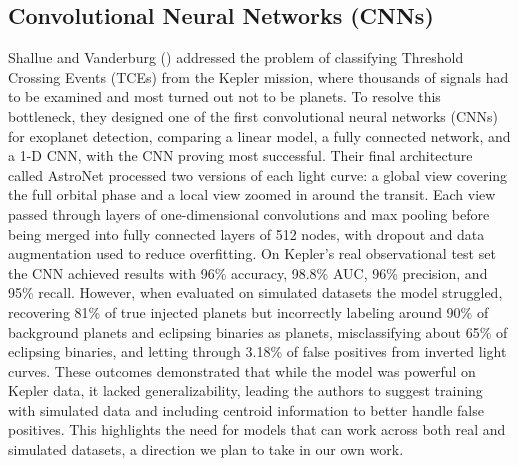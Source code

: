 \documentclass[letterpaper]{article} %
\begin{document}
\subsection{Convolutional Neural Networks (CNNs)}
Shallue and Vanderburg (\citeyear{Shallue2018identifyexoplanetsI}) addressed the problem of classifying Threshold Crossing Events (TCEs) from the Kepler mission, where thousands of signals had to be examined and most turned out not to be planets. To resolve this bottleneck, they designed one of the first convolutional neural networks (CNNs) for exoplanet detection, comparing a linear model, a fully connected network, and a 1-D CNN, with the CNN proving most successful. Their final architecture called AstroNet processed two versions of each light curve: a global view covering the full orbital phase and a local view zoomed in around the transit. Each view passed through layers of one-dimensional convolutions and max pooling before being merged into fully connected layers of 512 nodes, with dropout and data augmentation used to reduce overfitting. On Kepler’s real observational test set the CNN achieved results with 96\% accuracy, 98.8\% AUC, 96\% precision, and 95\% recall. However, when evaluated on simulated datasets the model struggled, recovering 81\% of true injected planets but incorrectly labeling around 90\% of background planets and eclipsing binaries as planets, misclassifying about 65\% of eclipsing binaries, and letting through 3.18\% of false positives from inverted light curves. These outcomes demonstrated that while the model was powerful on Kepler data, it lacked generalizability, leading the authors to suggest training with simulated data and including centroid information to better handle false positives. This highlights the need for models that can work across both real and simulated datasets, a direction we plan to take in our own work.
\end{document}
